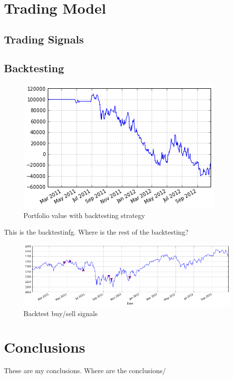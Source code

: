 \documentclass[]{article}
\begin{document}
\section{Trading Model}
\subsection{Trading Signals}
\subsection{Backtesting}
\begin{figure}[h!]
\centering
\includegraphics[scale=0.6]{paper/img/backtestPortValue.png}
\caption{Portfolio value with backtesting strategy}
\end{figure}

This is the backtestinfg. Where is the rest of the backtesting?
\begin{figure}[h!]
\centering
\includegraphics[scale=0.6]{paper/img/backtestNB.png}
\caption{Backtest buy/sell signals}
\end{figure}

\section{Conclusions}
These are my conclusions. Where are the conclusions/
\end{document}
